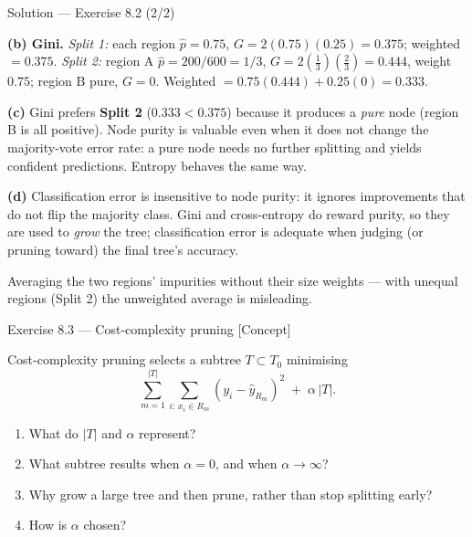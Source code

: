 \documentclass[aspectratio=169,11pt]{beamer}
\begin{document}
\begin{frame}{Solution --- Exercise 8.2 (2/2)}
\begin{solutionbox}
\textbf{(b) Gini.}
\emph{Split 1:} each region $\hat p=0.75$, $G=2(0.75)(0.25)=0.375$; weighted $=0.375$.
\emph{Split 2:} region A $\hat p=200/600=1/3$, $G=2(\tfrac13)(\tfrac23)=0.444$, weight $0.75$; region B pure, $G=0$. Weighted $=0.75(0.444)+0.25(0)=0.333$.

\medskip
\textbf{(c)} Gini prefers \textbf{Split 2} ($0.333<0.375$) because it produces a \emph{pure} node (region B is all positive). Node purity is valuable even when it does not change the majority-vote error rate: a pure node needs no further splitting and yields confident predictions. Entropy behaves the same way.

\medskip
\textbf{(d)} Classification error is insensitive to node purity: it ignores improvements that do not flip the majority class. Gini and cross-entropy do reward purity, so they are used to \emph{grow} the tree; classification error is adequate when judging (or pruning toward) the final tree's accuracy.
\end{solutionbox}
\begin{mistake}
Averaging the two regions' impurities without their size weights --- with unequal regions (Split 2) the unweighted average is misleading.
\end{mistake}
\end{frame}

\begin{frame}{Exercise 8.3 --- Cost-complexity pruning [Concept]}
\begin{exercise}
Cost-complexity pruning selects a subtree $T\subset T_0$ minimising
\[ \sum_{m=1}^{|T|}\sum_{i:\,x_i\in R_m}(y_i-\hat y_{R_m})^2 \;+\; \alpha\,|T|. \]
\begin{enumerate}
  \item What do $|T|$ and $\alpha$ represent?
  \item What subtree results when $\alpha=0$, and when $\alpha\to\infty$?
  \item Why grow a large tree and then prune, rather than stop splitting early?
  \item How is $\alpha$ chosen?
\end{enumerate}
\end{exercise}
\end{frame}
\end{document}
